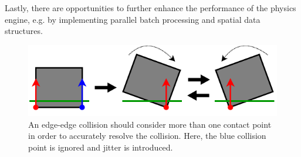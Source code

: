 Lastly, there are opportunities to further enhance the performance of the physics engine, e.g. by implementing parallel batch processing and spatial data structures.






\begin{figure}[h!]
  \centering
  \includegraphics[width = .7\linewidth]{figures/physics/jitter.pdf}
  \caption{An edge-edge collision should consider more than one contact point in order to accurately resolve the collision. Here, the blue collision point is ignored and jitter is introduced.}
  \label{fig:jitter}
\end{figure}